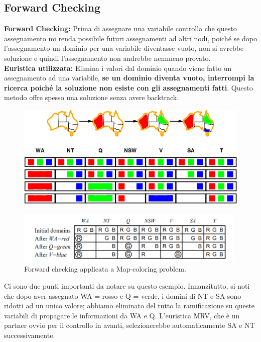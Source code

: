 \subsection{Forward Checking}
\textbf{Forward Checking: }  Prima di assegnare una variabile controlla che questo assegnamento mi renda possibile futuri assegnamenti ad altri nodi, poiché se dopo l'assegnamento un dominio per una variabile diventasse vuoto, non si avrebbe soluzione e quindi l'assegnamento non andrebbe nemmeno provato.
\\\textbf{Euristica utilizzata: }  Elimina i valori dal dominio quando viene fatto un
assegnamento ad una variabile, \textbf{se un dominio diventa vuoto, interrompi la ricerca poiché la soluzione non esiste con gli assegnamenti fatti}. Questo metodo offre spesso una soluzione senza avere backtrack.
\begin{figure}[H]
    \centering
    \includegraphics[width=12cm, keepaspectratio]{img/Cap2/forwod1.png}
\end{figure}
\begin{figure}[H]
    \centering
    \includegraphics[width=11cm, keepaspectratio]{img/Cap2/f2.png}
    \caption{Forward checking applicata a Map-coloring problem.}
\end{figure}
Ci sono due punti importanti da notare su questo esempio. Innanzitutto, si noti che dopo aver assegnato WA = rosso e Q = verde, i domini di NT e SA sono ridotti ad un unico valore; abbiamo eliminato del tutto la ramificazione su queste variabili di propagare le informazioni da WA e Q. L'euristica MRV, che è un partner ovvio per il controllo in avanti, selezionerebbe automaticamente SA e NT successivamente.

